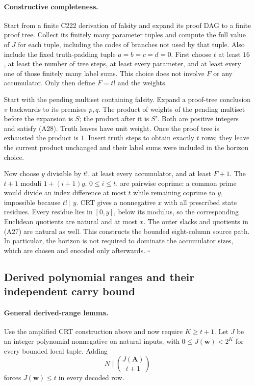 \paragraph{Constructive completeness.}
Start from a finite C222 derivation of falsity and expand its proof DAG
to a finite proof tree.  Collect its finitely many parameter tuples and
compute the full value of \(J\) for each tuple, including the codes of
branches not used by that tuple.  Also include the fixed truth-padding
tuple \(a=b=c=d=0\).  First choose \(t\) at least \(16\), at least the
number of tree steps, at least every parameter, and at least every one
of those finitely many label sums.  This choice does not involve \(F\)
or any accumulator.  Only then define \(F=t!\) and the weights.

Start with the pending multiset containing falsity.  Expand a proof-tree
conclusion \(v\) backwards to its premises \(p,q\).  The product of
weights of the pending multiset before the expansion is \(S\);
the product after it is \(S'\).  Both are positive integers and satisfy
(A28).  Truth leaves have unit weight.  Once the proof tree is
exhausted the product is \(1\).  Insert truth steps to obtain exactly
\(t\) rows; they leave the current product unchanged and their label
sums were included in the horizon choice.

Now choose \(y\) divisible by \(t!\), at least every accumulator,
and at least \(F+1\).  The \(t+1\) moduli
\(1+(i+1)y\), \(0\le i\le t\), are pairwise coprime:
a common prime would divide an index difference at most \(t\) while
remaining coprime to \(y\), impossible because \(t!\mid y\).
CRT gives a nonnegative \(x\) with all prescribed state residues.
Every residue lies in \([0,y]\), below its modulus, so the corresponding
Euclidean quotients are natural and at most \(x\).
The outer slacks and quotients in (A27) are natural as well.
This constructs the bounded eight-column source path.  In particular,
the horizon is not required to dominate the accumulator sizes,
which are chosen and encoded only afterwards.
\hfill\(\square\)

\subsection{Derived polynomial ranges and their independent carry bound}

\paragraph{General derived-range lemma.}
Use the amplified CRT construction above and now require \(K\ge t+1\).
Let \(J\) be an integer polynomial nonnegative on natural inputs, with
\(0\le J(\mathbf w)<2^K\) for every bounded local tuple.
Adding
\[
 N\mid\binom{J(\mathbf A)}{t+1}                         \tag{A31}
\]
forces \(J(\mathbf w)\le t\) in every decoded row.

